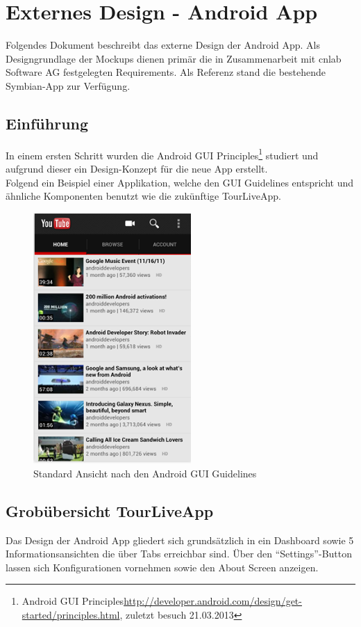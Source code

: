 \section{Externes Design - Android App}
\label{sec:externesdesignandroid}
Folgendes Dokument beschreibt das externe Design der Android App. Als Designgrundlage der Mockups dienen primär die in Zusammenarbeit mit cnlab Software AG festgelegten Requirements. Als Referenz stand die bestehende Symbian-App zur Verfügung. 

\subsection{Einführung}
In einem ersten Schritt wurden die Android GUI Principles\footnote{Android GUI Principles\url{http://developer.android.com/design/get-started/principles.html}, zuletzt besuch 21.03.2013}  studiert und aufgrund dieser ein Design-Konzept für die neue App erstellt.
\\

Folgend ein Beispiel einer Applikation, welche den GUI Guidelines entspricht und ähnliche Komponenten benutzt wie die zukünftige TourLiveApp.

\begin{figure}[H]
	\centering\includegraphics[width=60mm]{images/android/mockups/androidexample.png} 
	\caption{Standard Ansicht nach den Android GUI Guidelines}
\end{figure}

\subsection{Grobübersicht TourLiveApp}
Das Design der Android App gliedert sich grundsätzlich in ein Dashboard sowie 5 Informationsansichten die über Tabs erreichbar sind. Über den ``Settings''-Button lassen sich Konfigurationen vornehmen sowie den About Screen anzeigen.

